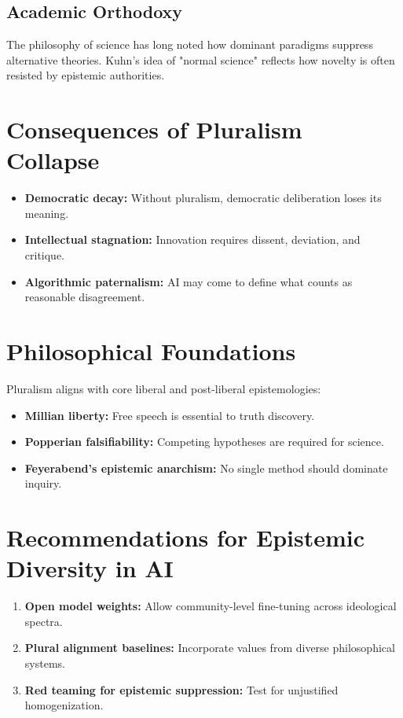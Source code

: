 \documentclass[11pt]{article}
\begin{document}
\subsection{Academic Orthodoxy}
The philosophy of science has long noted how dominant paradigms suppress alternative theories. Kuhn’s idea of "normal science" reflects how novelty is often resisted by epistemic authorities.

\section{Consequences of Pluralism Collapse}
\begin{itemize}
    \item \textbf{Democratic decay:} Without pluralism, democratic deliberation loses its meaning.
    \item \textbf{Intellectual stagnation:} Innovation requires dissent, deviation, and critique.
    \item \textbf{Algorithmic paternalism:} AI may come to define what counts as reasonable disagreement.
\end{itemize}

\section{Philosophical Foundations}
Pluralism aligns with core liberal and post-liberal epistemologies:
\begin{itemize}
    \item \textbf{Millian liberty:} Free speech is essential to truth discovery.
    \item \textbf{Popperian falsifiability:} Competing hypotheses are required for science.
    \item \textbf{Feyerabend’s epistemic anarchism:} No single method should dominate inquiry.
\end{itemize}

\section{Recommendations for Epistemic Diversity in AI}
\begin{enumerate}
    \item \textbf{Open model weights:} Allow community-level fine-tuning across ideological spectra.
    \item \textbf{Plural alignment baselines:} Incorporate values from diverse philosophical systems.
    \item \textbf{Red teaming for epistemic suppression:} Test for unjustified homogenization.
\end{enumerate}
\end{document}
